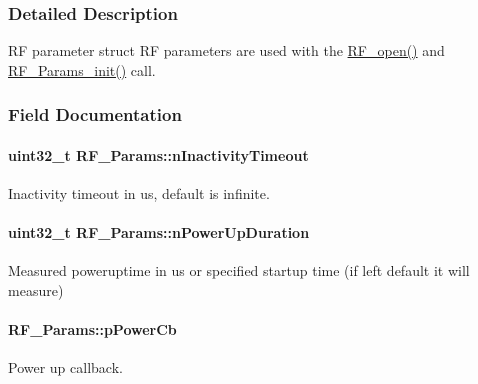 \subsubsection{Detailed Description}
R\+F parameter struct R\+F parameters are used with the \hyperlink{_r_f_8h_a13a7c6f5a2b797e0aac18fecfaba6f64}{R\+F\+\_\+open()} and \hyperlink{_r_f_8h_ab956de3745437cb7a69c4edfb006434e}{R\+F\+\_\+\+Params\+\_\+init()} call. 

\subsubsection{Field Documentation}
\paragraph[{n\+Inactivity\+Timeout}]{\setlength{\rightskip}{0pt plus 5cm}uint32\+\_\+t R\+F\+\_\+\+Params\+::n\+Inactivity\+Timeout}\label{struct_r_f___params_a01d3752799ea4318bbf9d1384cb49b97}


Inactivity timeout in us, default is infinite. 

\paragraph[{n\+Power\+Up\+Duration}]{\setlength{\rightskip}{0pt plus 5cm}uint32\+\_\+t R\+F\+\_\+\+Params\+::n\+Power\+Up\+Duration}\label{struct_r_f___params_a58dc682aa09acabe6411ea186dd3aebf}


Measured poweruptime in us or specified startup time (if left default it will measure) 

\paragraph[{p\+Power\+Cb}]{ R\+F\+\_\+\+Params\+::p\+Power\+Cb}\label{struct_r_f___params_ae683ebc129d40a11fb9ec7e371f1e11b}


Power up callback. 

